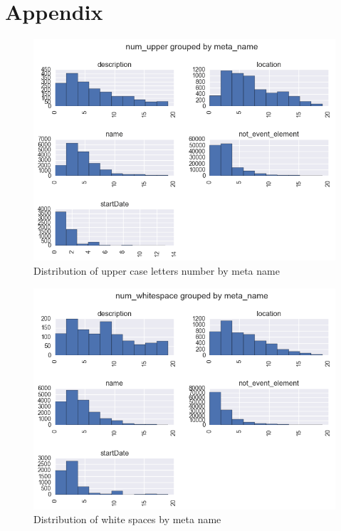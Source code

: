\chapter{Appendix}
\label{appendix}


\begin{figure}[h]
\begin{center}
\includegraphics[width=1.0\textwidth]{figures/distrUpperByMeta}
\caption{Distribution of upper case letters number by meta name}
\label{fig:distrUpperByMeta}
\end{center}
\end{figure}

\begin{figure}[h]
\begin{center}
\includegraphics[width=1.0\textwidth]{figures/distrWhiteByMeta}
\caption{Distribution of white spaces by meta name}
\label{fig:distrWhiteByMeta}
\end{center}
\end{figure}

